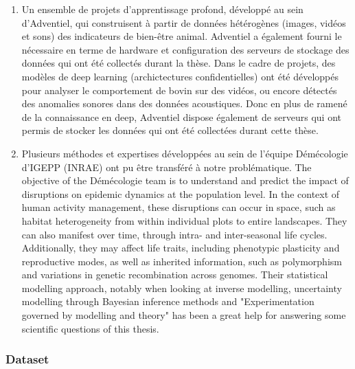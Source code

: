 \begin{enumerate}
    \item Un ensemble de projets d’apprentissage profond, développé au sein d’Adventiel, qui construisent à partir de données hétérogènes (images, vidéos et sons) des indicateurs de bien-être animal. Adventiel a également fourni le nécessaire en terme de hardware et configuration des serveurs de stockage des données qui ont été collectés durant la thèse. Dans le cadre de projets, des modèles de deep learning (archictectures confidentielles) ont été développés pour analyser le comportement de bovin sur des vidéos, ou encore détectés des anomalies sonores dans des données acoustiques. Donc en plus de ramené de la connaissance en deep, Adventiel dispose également de serveurs qui ont permis de stocker les données qui ont été collectées durant cette thèse. 

    \item Plusieurs méthodes et expertises développées au sein de l'équipe Démécologie d'IGEPP (INRAE) ont pu être transféré à notre problématique. The objective of the Démécologie team is to understand and predict the impact of disruptions on epidemic dynamics at the population level. In the context of human activity management, these disruptions can occur in space, such as habitat heterogeneity from within individual plots to entire landscapes. They can also manifest over time, through intra- and inter-seasonal life cycles. Additionally, they may affect life traits, including phenotypic plasticity and reproductive modes, as well as inherited information, such as polymorphism and variations in genetic recombination across genomes. Their statistical modelling approach, notably when looking at inverse modelling, uncertainty modelling through Bayesian inference methods and "Experimentation governed by modelling and theory" has been a great help for answering some scientific questions of this thesis.
\end{enumerate}


\subsubsection{Dataset}

